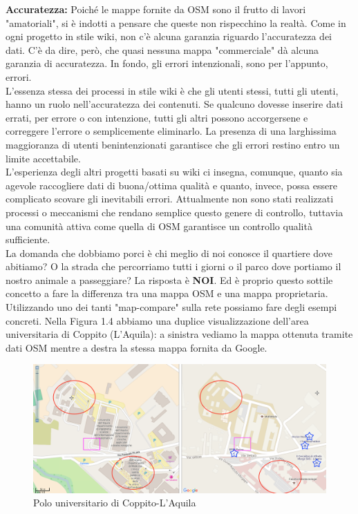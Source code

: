 \textbf{Accuratezza:} Poiché le mappe fornite da OSM sono il frutto di lavori "amatoriali", si è indotti a pensare che queste non rispecchino la realtà. Come in ogni progetto in stile wiki, non c'è alcuna garanzia riguardo l'accuratezza dei dati. C'è da dire, però, che quasi nessuna mappa "commerciale" dà alcuna garanzia di accuratezza. In fondo, gli errori intenzionali, sono per l'appunto, errori. \cite{ACCURATEZZA_MAPPE} \\
L'essenza stessa dei processi in stile wiki è che gli utenti stessi, tutti gli utenti, hanno un ruolo nell'accuratezza dei contenuti. Se qualcuno dovesse inserire dati errati, per errore o con intenzione, tutti gli altri possono accorgersene e correggere l'errore o semplicemente eliminarlo. La presenza di una larghissima maggioranza di utenti benintenzionati garantisce che gli errori restino entro un limite accettabile.\\
L'esperienza degli altri progetti basati su wiki ci insegna, comunque, quanto sia agevole raccogliere dati di buona/ottima qualità e quanto, invece, possa essere complicato scovare gli inevitabili errori.
Attualmente non sono stati realizzati processi o meccanismi che rendano semplice questo genere di controllo, tuttavia una comunità attiva come quella di OSM garantisce un controllo qualità sufficiente.\\
La domanda che dobbiamo porci è chi meglio di noi conosce il quartiere dove abitiamo? O la strada che percorriamo tutti i giorni o il parco dove portiamo il nostro animale a passeggiare? La risposta è \textbf{NOI}. Ed è proprio questo sottile concetto a fare la differenza tra una mappa OSM e una mappa proprietaria.\\
Utilizzando uno dei tanti "map-compare" sulla rete possiamo fare degli esempi concreti. Nella Figura 1.4 abbiamo una duplice visualizzazione dell'area universitaria di Coppito (L'Aquila): a sinistra vediamo la mappa ottenuta tramite dati OSM mentre a destra la stessa mappa fornita da Google.

\begin{figure}[H]
	\centering
	\includegraphics[scale=0.3]{OpenStreetMap/map_compare_coppito.png}
	\caption{Polo universitario di Coppito-L'Aquila}
	\label{fig:Compare_Coppito}
\end{figure}

